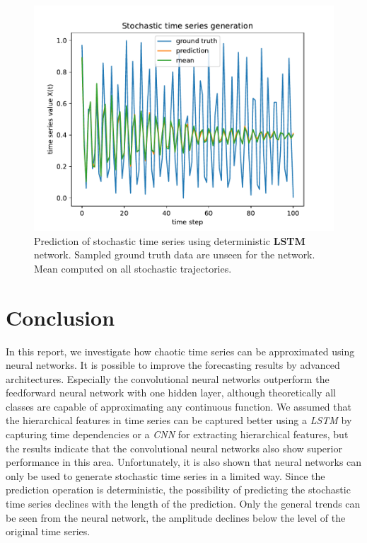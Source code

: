 \documentclass{article}
\begin{document}
\begin{figure}
  \centering
  \includegraphics[width=\textwidth]{figures/nn_limitation.pdf}
  \caption{Prediction of stochastic time series using deterministic 
  \textbf{LSTM} network. Sampled ground truth data are unseen for the network.
  Mean computed on all stochastic trajectories.}
  \label{fig:nn_limitation}
\end{figure} 

\section{Conclusion}

In this report, we investigate how chaotic time series can be approximated
using neural networks. It is possible to improve the forecasting results by 
advanced architectures. Especially the convolutional neural networks
outperform the feedforward neural network with one hidden layer,
although theoretically all classes are capable of approximating any continuous
function. We assumed that the hierarchical features in time series can be 
captured better using a \emph{LSTM} by capturing time dependencies or a 
\emph{CNN} for extracting hierarchical features, but the results indicate that
the convolutional neural networks also show superior performance in this area.
Unfortunately, it is also shown that neural networks can only be used to
generate stochastic time series in a limited way. Since the prediction operation
is deterministic, the possibility of predicting the stochastic time series
declines with the length of the prediction. Only the general trends can be seen
from the neural network, the amplitude declines below the level of the 
original time series.



\end{document}
